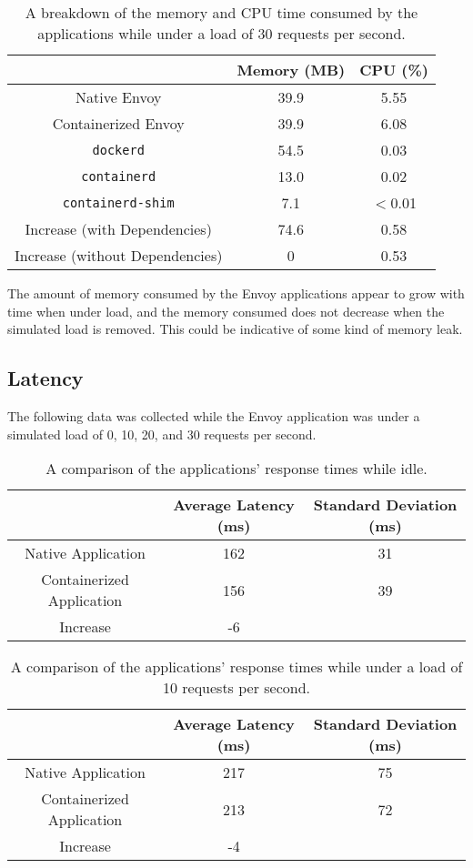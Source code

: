 \documentclass{article}
\begin{document}
\begin{table}[H]
\begin{tabular}{ |c|c|c| }
 \hline
   & Memory (MB) & CPU (\%) \\ 
 \hline
 Native Envoy & 39.9 & 5.55 \\
 \hline
 Containerized Envoy & 39.9 & 6.08 \\
 \hline
 \texttt{dockerd} & 54.5 & 0.03 \\
 \hline
 \texttt{containerd} & 13.0 & 0.02 \\
 \hline
 \texttt{containerd-shim} & 7.1 & $<$0.01 \\
 \hline\hline
 Increase (with Dependencies) & 74.6 & 0.58 \\
 \hline
 Increase (without Dependencies) & 0 & 0.53 \\
 \hline
\end{tabular}
\caption{A breakdown of the memory and CPU time consumed by the applications while under a load of 30 requests per second.}
\label{consumption-breakdown-under-load-30}
\end{table}

The amount of memory consumed by the Envoy applications appear to grow with time when under load, and the memory consumed does not decrease when the simulated load is removed. This could be indicative of some kind of memory leak.

\subsection{Latency}
The following data was collected while the Envoy application was under a simulated load of 0, 10, 20, and 30 requests per second.

\begin{table}[H]
\begin{tabular}{ |c|c|c| }
 \hline
 & Average Latency (ms) & Standard Deviation (ms) \\
 \hline
 Native Application & 162 & 31 \\
 \hline
 Containerized Application & 156 & 39 \\
 \hline\hline
 Increase & -6 & \\
 \hline
\end{tabular}
\caption{A comparison of the applications' response times while idle.}
\label{idle-latency}
\end{table}

\begin{table}[H]
\begin{tabular}{ |c|c|c| }
 \hline
 & Average Latency (ms) & Standard Deviation (ms) \\
 \hline
 Native Application & 217 & 75 \\
 \hline
 Containerized Application & 213 & 72 \\
 \hline\hline
 Increase & -4 & \\
 \hline
\end{tabular}
\caption{A comparison of the applications' response times while under a load of 10 requests per second.}
\label{latency-under-load-10}
\end{table}
\end{document}

